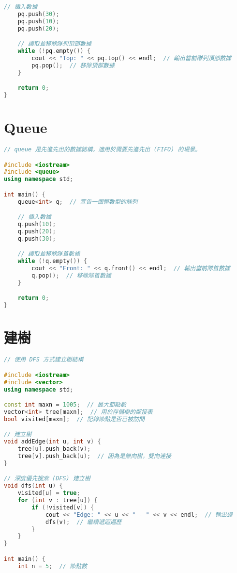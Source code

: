 \documentclass{article}
\begin{document}
\begin{multicols}{2}
\begin{lstlisting}[language=C++]
    // 插入數據
    pq.push(30);
    pq.push(10);
    pq.push(20);

    // 讀取並移除隊列頂部數據
    while (!pq.empty()) {
        cout << "Top: " << pq.top() << endl;  // 輸出當前隊列頂部數據
        pq.pop();  // 移除頂部數據
    }

    return 0;
}
\end{lstlisting}

\section{Queue}

\begin{lstlisting}[language=C++]
// queue 是先進先出的數據結構，適用於需要先進先出 (FIFO) 的場景。

#include <iostream>
#include <queue>
using namespace std;

int main() {
    queue<int> q;  // 宣告一個整數型的隊列

    // 插入數據
    q.push(10);
    q.push(20);
    q.push(30);

    // 讀取並移除隊首數據
    while (!q.empty()) {
        cout << "Front: " << q.front() << endl;  // 輸出當前隊首數據
        q.pop();  // 移除隊首數據
    }

    return 0;
}
\end{lstlisting}

\section{建樹}

\begin{lstlisting}[language=C++]
// 使用 DFS 方式建立樹結構

#include <iostream>
#include <vector>
using namespace std;

const int maxn = 1005;  // 最大節點數
vector<int> tree[maxn];  // 用於存儲樹的鄰接表
bool visited[maxn];  // 記錄節點是否已被訪問

// 建立樹
void addEdge(int u, int v) {
    tree[u].push_back(v);
    tree[v].push_back(u);  // 因為是無向樹，雙向連接
}

// 深度優先搜索 (DFS) 建立樹
void dfs(int u) {
    visited[u] = true;
    for (int v : tree[u]) {
        if (!visited[v]) {
            cout << "Edge: " << u << " - " << v << endl;  // 輸出邊
            dfs(v);  // 繼續遞迴遍歷
        }
    }
}

int main() {
    int n = 5;  // 節點數


\end{lstlisting}
\end{multicols}
\end{document}
